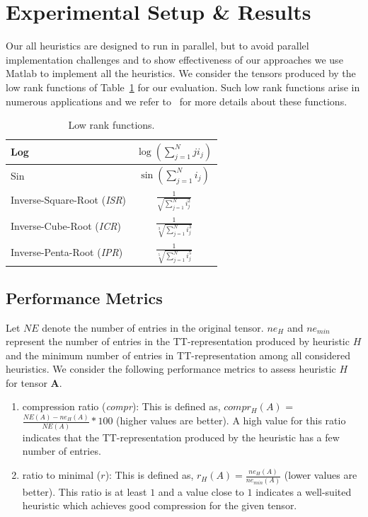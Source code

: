 \documentclass[runningheads]{llncs}
\newcommand{\tensor}[1]{\cal\textbf{#1}\xspace}
\begin{document}
\section{Experimental Setup \& Results}
\label{sec:expResults}
Our all heuristics are designed to run in parallel, but to avoid parallel implementation challenges and to show effectiveness of our approaches we use Matlab to implement all the heuristics. We consider the tensors produced by the low rank functions of Table~\ref{tab:lowRankFunctions} for our evaluation. Such low rank functions arise in numerous applications and we refer to~\cite{lowRankFunctions,lowRankFunction-BM-2005,lowRankFunction-HKT-2005} for more details about these functions.

\begin{table}[htb]
	\centering
	\begin{tabular}{|l|c|}
		\hline
		Log & $\log(\sum_{j=1}^{N}j i_j)$\\ \hline
		Sin & $\sin(\sum_{j=1}^{N}i_j)$\\ \hline
		Inverse-Square-Root (\textit{ISR}) & $\frac{1}{\sqrt{\sum_{j=1}^{N}i_j^2}}$\\ \hline
		Inverse-Cube-Root (\textit{ICR}) & $\frac{1}{\sqrt[3]{\sum_{j=1}^{N}i_j^3}}$\\ \hline
		Inverse-Penta-Root (\textit{IPR}) & $\frac{1}{\sqrt[5]{\sum_{j=1}^{N}i_j^5}}$\\ \hline
	\end{tabular}
	\caption{Low rank functions.\label{tab:lowRankFunctions}}
\end{table}

\subsection{Performance Metrics}

Let $NE$ denote the number of entries in the original tensor. $ne_H$ and $ne_{min}$ represent the number of entries in the TT-representation produced by heuristic $H$ and the minimum number of entries in TT-representation among all considered heuristics. We consider the following performance metrics to assess heuristic $H$ for tensor \tensor{A}.
\begin{enumerate}
	\item compression ratio (\textit{compr}): This is defined as, $compr_H(A)$ = $\frac{NE(A)- ne_H(A)}{NE(A)}*100$ (higher values are better). A high value for this ratio indicates that the TT-representation produced by the heuristic has a few number of entries.
	\item ratio to minimal ($r$): This is defined as, $r_H(A) = \frac{ne_H(A)}{ne_{min}(A)}$ (lower values are better). This ratio is at least $1$ and a value close to $1$ indicates a well-suited heuristic which achieves good compression for the given tensor. 
\end{enumerate}
\end{document}
